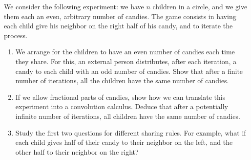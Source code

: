  
\begin{exo}
\label{exo-iterations-integers}
 
 We consider the following experiment: we have $ n $ children in a circle, and we give them each an even, arbitrary number of candies. The game consists in having each child give his neighbor on the right half of his candy, and to iterate the process. \begin{enumerate}
\item We arrange for the children to have an even number of candies each time they share. For this, an external person distributes, after each iteration, a candy to each child with an odd number of candies. Show that after a finite number of iterations, all the children have the same number of candies.
\item If we allow fractional parts of candies, show how we can translate this experiment into a convolution calculus. Deduce that after a potentially infinite number of iterations, all children have the same number of candies.
\item Study the first two questions for different sharing rules. For example, what if each child gives half of their candy to their neighbor on the left, and the other half to their neighbor on the right?
\end{enumerate}
\end{exo}
 
